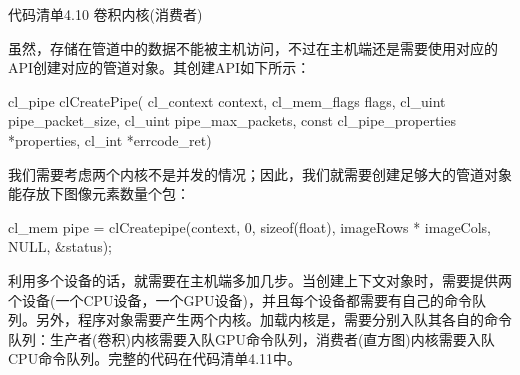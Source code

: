 代码清单4.10 卷积内核(消费者)

虽然，存储在管道中的数据不能被主机访问，不过在主机端还是需要使用对应的API创建对应的管道对象。其创建API如下所示：

\begin{codebox}[cpp]
cl_pipe clCreatePipe(
  cl_context context,
  cl_mem_flags flags,
  cl_uint pipe_packet_size,
  cl_uint pipe_max_packets,
  const cl_pipe_properties *properties,
  cl_int *errcode_ret)
\end{codebox}

我们需要考虑两个内核不是并发的情况；因此，我们就需要创建足够大的管道对象能存放下图像元素数量个包：

\begin{codebox}[cpp]
cl_mem pipe = clCreatepipe(context, 0, sizeof(float), imageRows * imageCols, NULL, &status);
\end{codebox}

利用多个设备的话，就需要在主机端多加几步。当创建上下文对象时，需要提供两个设备(一个CPU设备，一个GPU设备)，并且每个设备都需要有自己的命令队列。另外，程序对象需要产生两个内核。加载内核是，需要分别入队其各自的命令队列：生产者(卷积)内核需要入队GPU命令队列，消费者(直方图)内核需要入队CPU命令队列。完整的代码在代码清单4.11中。

